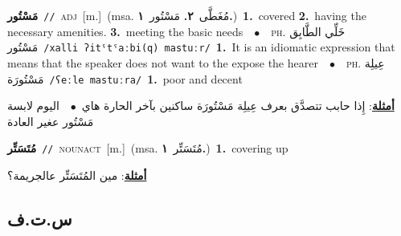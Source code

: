 \documentclass[10pt,a4paper,twoside]{article} %
\begin{document}
\begin{multicols}{2}
{\setlength\topsep{0pt}\textbf{\foreignlanguage{arabic}{مَسْتُور}}\ {\color{gray}\texttt{//}\color{black}}\ \textsc{adj}\ [m.]\ \color{gray}(msa. \foreignlanguage{arabic}{مُغَطَّى}~\foreignlanguage{arabic}{\textbf{٢.}}  \foreignlanguage{arabic}{مَسْتُور}~\foreignlanguage{arabic}{\textbf{١.}})\color{black}\ \textbf{1.}~covered  \textbf{2.}~having the necessary amenities.  \textbf{3.}~meeting the basic needs\ \ $\bullet$\ \ \textsc{ph.} \color{gray} \foreignlanguage{arabic}{خَلِّي الطَّابِق مَسْتُور}\color{black}\ {\color{gray}\texttt{/{\sffamily xalli ʔitˤtˤaːbi(q) mastuːr}/}\color{black}}\ \textbf{1.}~It is an idiomatic expression that means that the speaker does not want to the expose the hearer\ \ $\bullet$\ \ \textsc{ph.} \color{gray} \foreignlanguage{arabic}{عِيلِة مَسْتُورَة}\color{black}\ {\color{gray}\texttt{/{\sffamily ʕeːle mastuːra}/}\color{black}}\ \textbf{1.}~poor and decent\  \begin{flushright}\color{gray}\foreignlanguage{arabic}{\textbf{\underline{\foreignlanguage{arabic}{أمثلة}}}: إِذا حابب تتصدَّق بعرف عِيلِة مَسْتُورَة ساكنين بآخر الحارة هاي\ $\bullet$\ \  اليوم لابسة مَسْتُور عغير العادة}\end{flushright}\color{black}} \vspace{2mm}

{\setlength\topsep{0pt}\textbf{\foreignlanguage{arabic}{مُتَسَتِّر}}\ {\color{gray}\texttt{//}\color{black}}\ \textsc{noun\textunderscore act}\ [m.]\ \color{gray}(msa. \foreignlanguage{arabic}{مُتَسَتِّر}~\foreignlanguage{arabic}{\textbf{١.}})\color{black}\ \textbf{1.}~covering up\  \begin{flushright}\color{gray}\foreignlanguage{arabic}{\textbf{\underline{\foreignlanguage{arabic}{أمثلة}}}: مين المُتَسَتِّر عالجريمة؟}\end{flushright}\color{black}} \vspace{2mm}

\vspace{-3mm}
\subsection*{\color{blue}\foreignlanguage{arabic}{س.ت.ف}\color{blue}{}} 


\end{multicols}
\end{document}
